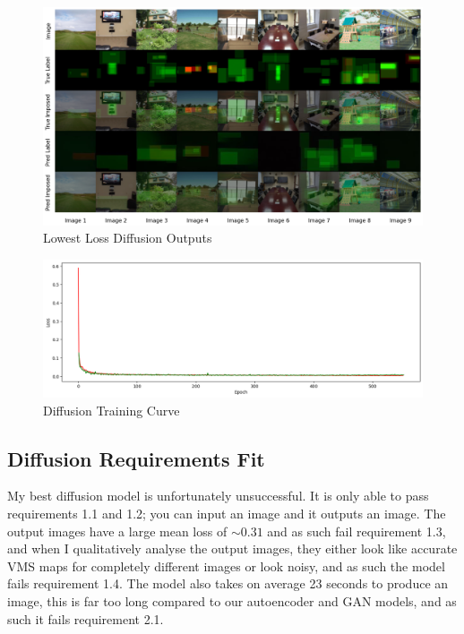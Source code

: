 \documentclass{UoYCSproject}
\begin{document}
\begin{figure}[ht]
    \centering
    \includegraphics[width=\linewidth]{Diffusion Best Outputs}
    \caption{Lowest Loss Diffusion Outputs}
    \label{fig:DiffusionBestOutputs}
\end{figure}

\begin{figure}[ht]
    \centering
    \includegraphics[width=\linewidth]{Diffusion training curve}
    \caption{Diffusion Training Curve}
    \label{fig:DiffusionTraining}
\end{figure}

\subsection{Diffusion Requirements Fit}

My best diffusion model is unfortunately unsuccessful. It is only able to pass requirements 1.1 and 1.2; you can input an image and it outputs an image. The output images have a large mean loss of \( \sim 0.31 \) and as such fail requirement 1.3, and when I qualitatively analyse the output images, they either look like accurate VMS maps for completely different images or look noisy, and as such the model fails requirement 1.4. The model also takes on average 23 seconds to produce an image, this is far too long compared to our autoencoder and GAN models, and as such it fails requirement 2.1. 
\end{document}
